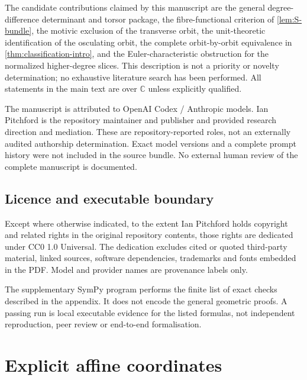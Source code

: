 \documentclass[11pt,reqno]{amsart}
\theoremstyle{definition}
\theoremstyle{remark}
\newcommand{\C}{\mathbb C}
\begin{document}
The candidate contributions claimed by this manuscript are the general
degree-difference determinant and torsor package, the fibre-functional
criterion of \cref{lem:S-bundle}, the motivic exclusion of the transverse
orbit, the unit-theoretic identification of the osculating orbit, the
complete orbit-by-orbit equivalence in \cref{thm:classification-intro},
and the Euler-characteristic obstruction for the normalized higher-degree
slices.  This description is not a priority or novelty determination; no
exhaustive literature search has been performed.  All statements in the
main text are over $\C$ unless explicitly qualified.

The manuscript is attributed to OpenAI Codex / Anthropic models.
Ian Pitchford is the repository maintainer and publisher and provided
research direction and mediation.  These are repository-reported roles,
not an externally audited authorship determination.  Exact model versions
and a complete prompt history were not included in the source bundle.
No external human review of the complete manuscript is documented.

\subsection*{Licence and executable boundary}

Except where otherwise indicated, to the extent Ian Pitchford holds
copyright and related rights in the original repository contents, those
rights are dedicated under CC0 1.0 Universal.  The dedication excludes
cited or quoted third-party material, linked sources, software
dependencies, trademarks and fonts embedded in the PDF.  Model and
provider names are provenance labels only.

The supplementary SymPy program performs the finite list of exact checks
described in the appendix.  It does not encode the general geometric
proofs.  A passing run is local executable evidence for the listed
formulas, not independent reproduction, peer review or end-to-end
formalisation.


\appendix

\section{Explicit affine coordinates}\label{app:coordinates}
\end{document}
